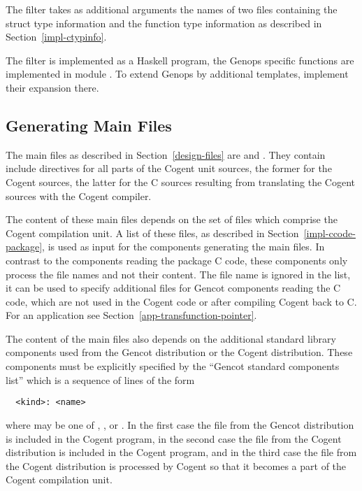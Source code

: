 The filter takes as additional arguments the names of two files containing the struct type information and the function
type information as described in Section~\ref{impl-ctypinfo}. 

The filter is implemented as a Haskell program, the Genops specific functions are implemented in module
. To extend Genops by additional templates, implement their expansion there.

\subsection{Generating Main Files}
\label{impl-ocomps-main}

The main files as described in Section~\ref{design-files} are  and . They
contain include directives for all parts of the Cogent unit sources, the former for the Cogent sources, the latter 
for the C sources resulting from translating the Cogent sources with the Cogent compiler.

The content of these main files depends on the set of  files which comprise the Cogent compilation unit.
A list of these files, as described in Section~\ref{impl-ccode-package}, is used as input for the components generating
the main files. In contrast to the components reading the package C code, these components only process the file 
names and not their content. The file name  is ignored in the list, it can be used
to specify additional  files for Gencot components reading the C code, which are not used in the Cogent 
code or after compiling Cogent back to C. For an application see Section~\ref{app-transfunction-pointer}.

The content of the main files also depends on the additional standard library components used from the Gencot distribution
or the Cogent distribution. These components must be explicitly specified by the ``Gencot standard components list'' which
is a sequence of lines of the form
\begin{verbatim}
  <kind>: <name>
\end{verbatim}
where  may be one of , , or . In the first case the file
 from the Gencot distribution is included in the Cogent program, in the 
second case the file  from the Cogent distribution is included in the 
Cogent program, and in the third case the file  from the Cogent distribution 
is processed by Cogent so that it becomes a part of the Cogent compilation unit.

